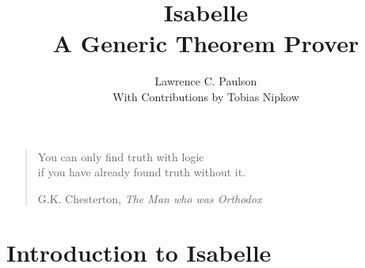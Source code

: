 
\sloppy%

\title{Isabelle\\A Generic Theorem Prover}
\author{Lawrence C. Paulson\\[2ex] With Contributions by Tobias Nipkow}

\date{} 
\makeindex
\let\idx=\ttindexbold
\def\S{Sect.\thinspace}%

\underscoreoff

\setcounter{secnumdepth}{1} \setcounter{tocdepth}{1}

\binperiod     %


\maketitle



\tableofcontents
\newpage


\markboth{}{}
\vspace*{2.5cm}
\begin{quote}
\raggedleft
{\sanssi
You can only find truth with logic\\
if you have already found truth without it.}\\
\bigskip

G.K. Chesterton, {\em The Man who was Orthodox}
\end{quote}



\part{Introduction to Isabelle}   

\begingroup
\newcommand\qeq{\stackrel{?}{\equiv}}  %
\newcommand{\nand}{\mathbin{\lnot\&}} 
\newcommand{\xor}{\mathbin{\#}}
\let\part=\chapter



\endgroup


